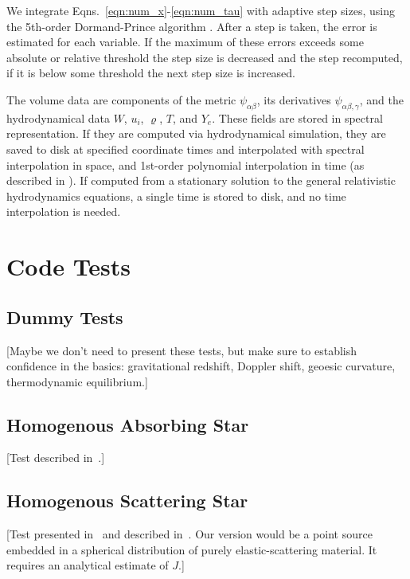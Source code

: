 \documentclass[aps,floatfix,prd,superscriptaddress,twocolumn]{revtex4-1}
\newcommand{\todo}[1]{\marginpar{\tiny{\textcolor{red}{#1}}}}
\begin{document}
We integrate Eqns.~\ref{eqn:num_x}-\ref{eqn:num_tau} with adaptive step sizes,
using the 5th-order Dormand-Prince algorithm \cite{pres2007-nr_3rd_ed}.
After a step is taken, the error is estimated for each variable.
If the maximum of these errors exceeds some absolute or relative threshold
the step size is decreased and the step recomputed,
if it is below some threshold the next step size is increased.
\todo{specify}

The volume data are components of the metric $\psi_{\alpha\beta}$,
its derivatives $\psi_{\alpha\beta,\gamma}$,
and the hydrodynamical data $W$, $u_i$, $\varrho$, $T$, and $Y_e$.
These fields are stored in spectral representation.
If they are computed via hydrodynamical simulation, they are saved to disk
at specified coordinate times and interpolated
with spectral interpolation in space,
and 1st-order polynomial interpolation in time
(as described in \cite[App.~B]{bohn2016-code}).
If computed from a stationary solution to the
general relativistic hydrodynamics equations,
a single time is stored to disk, and no time interpolation is needed.

\section{Code Tests}
\label{sec:tests}

\subsection{Dummy Tests}
\label{ssec:tests_basic}
[Maybe we don't need to present these tests, but make sure to establish
confidence in the basics:
gravitational redshift, Doppler shift,
geoesic curvature, thermodynamic equilibrium.]
\todo{setup and run dummy tests}

\subsection{Homogenous Absorbing Star}
\label{ssec:test_ab_star}
[Test described in~\cite[Sec.~3.2]{smit1997-two_moment}.]
\todo{Jerred: run test}

\subsection{Homogenous Scattering Star}
\label{ssec:test_sc_star}
\todo{maybe drop this test}
[Test presented in~\cite{humm1971-grey_transfer}
and described in~\cite[Sec.~9.1.1]{abdi2012-monte_carlo}.
Our version would be a point source embedded in a spherical distribution
of purely elastic-scattering material. It requires an analytical estimate
of $J$.]
\todo{formulate analytic $J$.}
\end{document}

